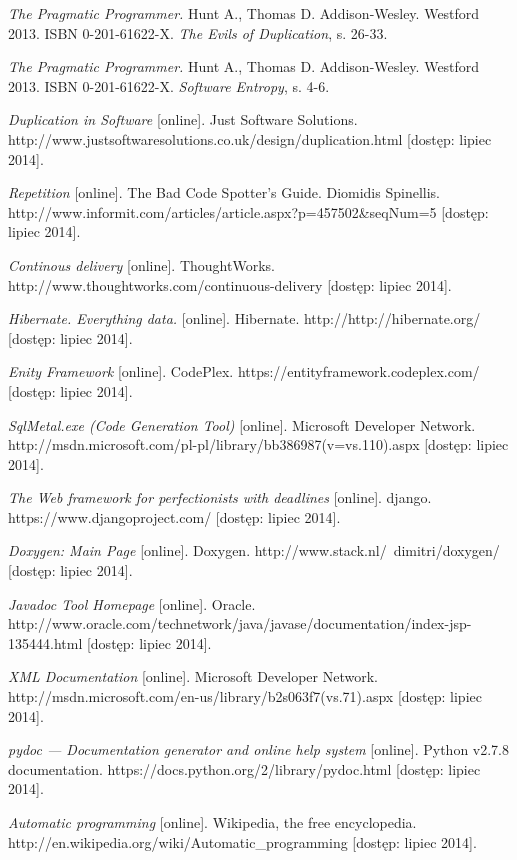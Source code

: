 \begin{thebibliography}{}

  \emph{The Pragmatic Programmer.}
  Hunt A., Thomas D.
  Addison-Wesley.
  Westford 2013.
  ISBN 0-201-61622-X.
  \emph{The Evils of Duplication}, s. 26-33.
 
  \emph{The Pragmatic Programmer.}
  Hunt A., Thomas D.
  Addison-Wesley.
  Westford 2013.
  ISBN 0-201-61622-X.
  \emph{Software Entropy}, s. 4-6.
 
  \emph{Duplication in Software} [online].
  Just Software Solutions.
  http://www.justsoftwaresolutions.co.uk/design/duplication.html [dostęp: lipiec 2014].
  
  \emph{Repetition} [online].
  The Bad Code Spotter's Guide.
  Diomidis Spinellis.
  http://www.informit.com/articles/article.aspx?p=457502\&seqNum=5 [dostęp: lipiec 2014].
 
  \emph{Continous delivery} [online].
  ThoughtWorks.
  http://www.thoughtworks.com/continuous-delivery [dostęp: lipiec 2014].
 
  \emph{Hibernate. Everything data.} [online].
  Hibernate.
  http://http://hibernate.org/ [dostęp: lipiec 2014].
 
  \emph{Enity Framework} [online].
  CodePlex.
  https://entityframework.codeplex.com/ [dostęp: lipiec 2014].
 
  \emph{SqlMetal.exe (Code Generation Tool)} [online].
  Microsoft Developer Network.
  http://msdn.microsoft.com/pl-pl/library/bb386987(v=vs.110).aspx [dostęp: lipiec 2014].
 
  \emph{The Web framework for perfectionists with deadlines} [online].
  django.
  https://www.djangoproject.com/ [dostęp: lipiec 2014].
  
  \emph{Doxygen: Main Page} [online].
  Doxygen.
  http://www.stack.nl/~dimitri/doxygen/ [dostęp: lipiec 2014].
  
  \emph{Javadoc Tool Homepage} [online].
  Oracle.
  http://www.oracle.com/technetwork/java/javase/documentation/index-jsp-135444.html [dostęp: lipiec 2014].
  
  \emph{XML Documentation} [online].
  Microsoft Developer Network.
  http://msdn.microsoft.com/en-us/library/b2s063f7(vs.71).aspx [dostęp: lipiec 2014].
  
  \emph{pydoc — Documentation generator and online help system} [online].
  Python v2.7.8 documentation.
  https://docs.python.org/2/library/pydoc.html [dostęp: lipiec 2014].
 
  \emph{Automatic programming} [online].
  Wikipedia, the free encyclopedia.
  http://en.wikipedia.org/wiki/Automatic\_programming [dostęp: lipiec 2014].
  
\end{thebibliography}
